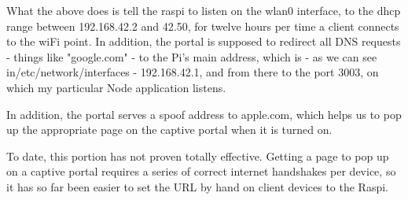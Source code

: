 What the above does is tell the raspi to listen on the wlan0 interface, to the dhcp range between 192.168.42.2 and 42.50, for twelve hours per time a client connects to the wiFi point.  In addition, the portal is supposed to redirect all DNS requests - things like "google.com" - to the Pi's main address, which is - as we can see in/etc/network/interfaces - 192.168.42.1, and from there to the port 3003, on which my particular Node application listens.

In addition, the portal serves a spoof address to apple.com, which helps us to pop up the appropriate page on the captive portal when it is turned on. 

To date, this portion has not proven totally effective. Getting a page to pop up on a captive portal requires a series of correct internet handshakes per device, so it has so far been easier to set the URL by hand on client devices to the Raspi.